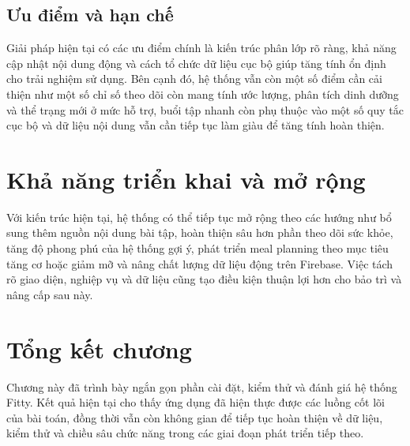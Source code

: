 \subsection{Ưu điểm và hạn chế}

Giải pháp hiện tại có các ưu điểm chính là kiến trúc phân lớp rõ ràng, khả năng cập nhật nội dung động và cách tổ chức dữ liệu cục bộ giúp tăng tính ổn định cho trải nghiệm sử dụng. Bên cạnh đó, hệ thống vẫn còn một số điểm cần cải thiện như một số chỉ số theo dõi còn mang tính ước lượng, phân tích dinh dưỡng và thể trạng mới ở mức hỗ trợ, buổi tập nhanh còn phụ thuộc vào một số quy tắc cục bộ và dữ liệu nội dung vẫn cần tiếp tục làm giàu để tăng tính hoàn thiện.

\section{Khả năng triển khai và mở rộng}

Với kiến trúc hiện tại, hệ thống có thể tiếp tục mở rộng theo các hướng như bổ sung thêm nguồn nội dung bài tập, hoàn thiện sâu hơn phần theo dõi sức khỏe, tăng độ phong phú của hệ thống gợi ý, phát triển meal planning theo mục tiêu tăng cơ hoặc giảm mỡ và nâng chất lượng dữ liệu động trên Firebase. Việc tách rõ giao diện, nghiệp vụ và dữ liệu cũng tạo điều kiện thuận lợi hơn cho bảo trì và nâng cấp sau này.

\section{Tổng kết chương}

Chương này đã trình bày ngắn gọn phần cài đặt, kiểm thử và đánh giá hệ thống Fitty. Kết quả hiện tại cho thấy ứng dụng đã hiện thực được các luồng cốt lõi của bài toán, đồng thời vẫn còn không gian để tiếp tục hoàn thiện về dữ liệu, kiểm thử và chiều sâu chức năng trong các giai đoạn phát triển tiếp theo.
